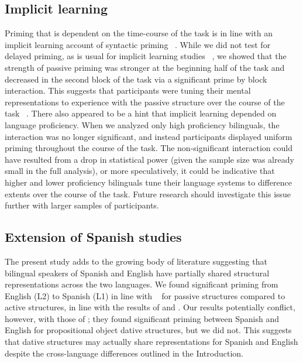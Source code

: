 \subsection{Implicit learning}
\label{implicitlearning}

Priming that is dependent on the time-course of the task is in line with an implicit learning account of syntactic priming ~\citep{Bock2000, Bock2007, Chang2006}. While we did not test for delayed priming, as is usual for implicit learning studies ~\citep[e.g.,][]{Bock2000}, we showed that the strength of passive priming was stronger at the beginning half of the task and decreased in the second block of the task via a significant prime by block interaction. This suggests that participants were tuning their mental representations to experience with the passive structure over the course of the task ~\citep{Chang2006}. There also appeared to be a hint that implicit learning depended on language proficiency. When we analyzed only high proficiency bilinguals, the interaction was no longer significant, and instead participants displayed uniform priming throughout the course of the task. The non-significant interaction could have resulted from a drop in statistical power (given the sample size was already small in the full analysis), or more speculatively, it could be indicative that higher and lower proficiency bilinguals tune their language systems to difference extents over the course of the task. Future research should investigate this issue further with larger samples of participants. 

\subsection{Extension of Spanish studies}
\label{extensionofspanishstudies}

The present study adds to the growing body of literature suggesting that bilingual speakers of Spanish and English have partially shared structural representations across the two languages. We found significant priming from English (L2) to Spanish (L1) in line with ~\citep{Meijer2003} for passive structures compared to active structures, in line with the results of  \citet{Hartsuiker2004} and  \citet{Flett2003}. Our results potentially conflict, however, with those of  \citet{Meijer2003}; they found significant priming between Spanish and English for propositional object dative structures, but we did not. This suggests that dative structures may actually share representations for Spanish and English despite the cross-language differences outlined in the Introduction. 

